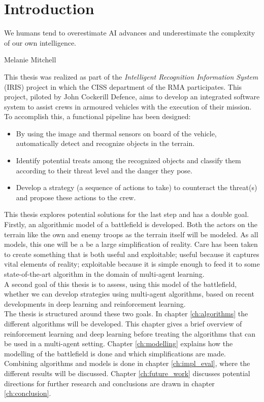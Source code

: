\chapter{Introduction}

\epigraph{We humans tend to overestimate AI advances and underestimate the complexity of our own intelligence.} {Melanie Mitchell}
This thesis was realized as part of the \emph{Intelligent Recognition Information System} (IRIS) project in which the CISS department of the RMA participates. This project, piloted by John Cockerill Defence, aims to develop an integrated software system to assist crews in armoured vehicles with the execution of their mission. To accomplish this, a functional pipeline has been designed:
\begin{itemize}
    \item By using the image and thermal sensors on board of the vehicle, automatically detect and recognize objects in the terrain.
    \item Identify potential treats among the recognized objects and classify them according to their threat level and the danger they pose.
    \item Develop a strategy (a sequence of actions to take) to counteract the threat(s) and propose these actions to the crew.
\end{itemize}
This thesis explores potential solutions for the last step and has a double goal.\\
Firstly, an algorithmic model of a battlefield is developed. Both the actors on the terrain like the own and enemy troops as the terrain itself will be modeled. As all models, this one will be a be a large simplification of reality. Care has been taken to create something that is both useful and exploitable; useful because it captures vital elements of reality; exploitable because it is simple enough to feed it to some state-of-the-art algorithm in the domain of multi-agent learning.\\
A second goal of this thesis is to assess, using this model of the battlefield, whether we can develop strategies using multi-agent algorithms, based on recent developments in deep learning and reinforcement learning.\\
The thesis is structured around these two goals. In chapter \ref{ch:algorithms} the different algorithms will be developed. This chapter gives a brief overview of reinforcement learning and deep learning before treating the algorithms that can be used in a multi-agent setting. Chapter \ref{ch:modelling} explains how the modelling of the battlefield is done and which simplifications are made. Combining algorithms and models is done in chapter \ref{ch:impl_eval}, where the different results will be discussed. Chapter \ref{ch:future_work} discusses potential directions for further research and conclusions are drawn in chapter \ref{ch:conclusion}.

